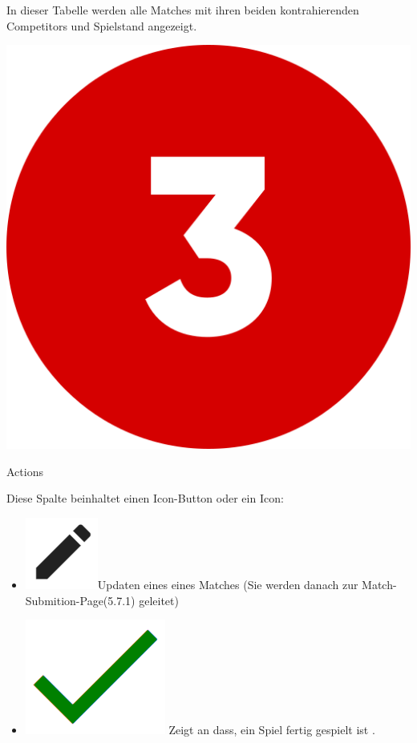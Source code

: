 In dieser Tabelle werden alle Matches mit ihren beiden kontrahierenden Competitors und Spielstand angezeigt.  

\bigskip
\includegraphics[scale=0.05]{pics/user-guide/numbers/number-3.png} \begin{LARGE} Actions \end{LARGE}

Diese Spalte beinhaltet einen Icon-Button oder ein Icon:
\begin{itemize}
    \item \includegraphics[scale=0.3]{pics/user-guide/edit-icon.PNG}Updaten eines eines Matches (Sie werden danach zur Match-Submition-Page(5.7.1) geleitet)
    \item \includegraphics[scale=0.2]{pics/user-guide/finished-icon.PNG} Zeigt an dass, ein Spiel fertig gespielt ist .
\end{itemize}


